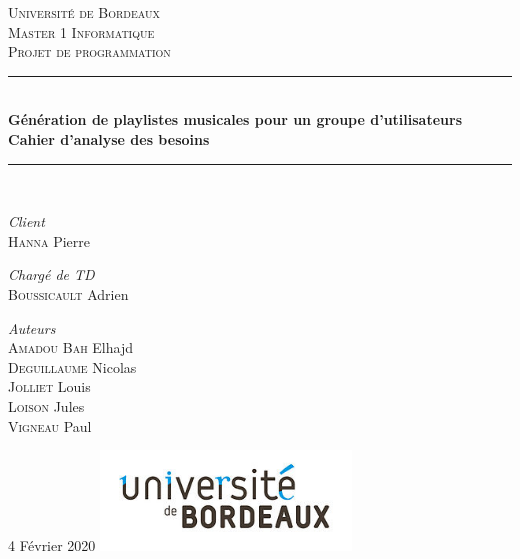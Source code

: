\documentclass{article}
\begin{document}
\begin{titlepage}
	\newcommand{\HRule}{\rule{\linewidth}{0.5mm}}
					
	\center
					
	\textsc{\LARGE Université de Bordeaux}\\[1.5cm]
					
	\textsc{\Large Master 1 Informatique}\\[0.5cm]
					
	\textsc{\large Projet de programmation}\\[0.5cm]
					
	\HRule\\[0.4cm]
					
	{\huge\bfseries Génération de playlistes musicales pour un groupe d'utilisateurs}\\[0.4cm]
	{\Large\bfseries Cahier d'analyse des besoins}
	\HRule\\[1.5cm]
					
	\begin{minipage}{0.4\textwidth}
			
		\begin{flushleft}
			\large
			\textit{Client}\\
			\textsc{Hanna}  Pierre 
		\end{flushleft}
				
		\begin{flushleft}
			\large
			\textit{Chargé de TD}\\
			\textsc{Boussicault}  Adrien 
		\end{flushleft}
				
		\begin{flushleft}
			\large
			\textit{Auteurs}\\
			\textsc{Amadou Bah}  Elhajd 
			\\
			\textsc{Deguillaume} Nicolas
			\\
			\textsc{Jolliet} Louis
			\\
			\textsc{Loison} Jules 
			\\
			\textsc{Vigneau} Paul 
		\end{flushleft}
				
	\end{minipage}
	\vfill\vfill\vfill
					
	{\large 4 Février 2020}
	\vfill\vfill
	\includegraphics[width=0.5\textwidth]{ressources/Logo.jpg}\\[1cm]
		\vfill
		\end{titlepage}
		\justify
		\renewcommand{\contentsname}{Table des matières}
		\tableofcontents
		\newpage
								
\end{document}
